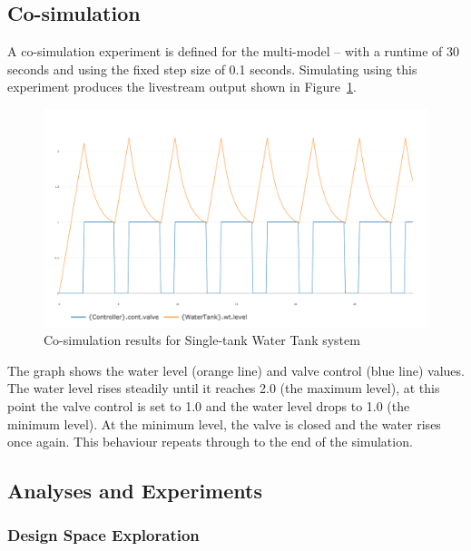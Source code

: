 \subsection{Co-simulation}
\label{sec:singletank_into_co}

A co-simulation experiment is defined for the multi-model -- with a runtime of 30 seconds and using the fixed step size of 0.1 seconds. Simulating using this experiment produces the livestream output shown in Figure~\ref{fig:cosim-graph}.

\begin{figure}[htbp]
\begin{center}
\includegraphics[width=1\textwidth]{singletank/cosim-results.png}
\caption{Co-simulation results for Single-tank Water Tank system}
\label{fig:cosim-graph}
\end{center}
\end{figure}

The graph shows the water level (orange line) and valve control (blue line) values. The water level rises steadily until it reaches 2.0 (the maximum level), at this point the valve control is set to 1.0 and the water level drops to 1.0 (the minimum level). At the minimum level, the valve is closed and the water rises once again. This behaviour repeats through to the end of the simulation. 

\subsection{Analyses and Experiments}

\subsubsection{Design Space Exploration}
\label{sec:singletank_dse}

